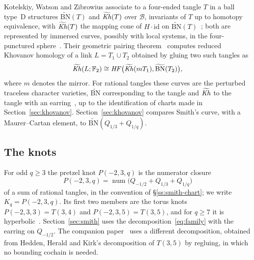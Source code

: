 Kotelskiy, Watson and Zibrowius associate to a four-ended tangle $T$ in a ball type~D structures
$\widetilde{\mathrm{BN}}(T)$ and $\widetilde{\mathit{Kh}}(T)$ over $\mathcal B$, invariants of $T$ up to homotopy
equivalence, with $\widetilde{\mathit{Kh}}(T)$ the mapping cone of $H\cdot\mathrm{id}$ on
$\widetilde{\mathrm{BN}}(T)$~\cite[Def.~6.5]{KWZ}; both are represented by immersed curves, possibly with local
systems, in the four-punctured sphere~\cite{KWZ}. Their geometric pairing
theorem~\cite[Thm.~1.9]{KWZ} computes reduced Khovanov homology of a link $L=T_1\cup T_2$ obtained by gluing two
such tangles as
\[
\widetilde{\mathit{Kh}}(L;\mathbb{F}_2)\cong\mathit{HF}\bigl(\widetilde{\mathit{Kh}}(mT_1),\widetilde{\mathrm{BN}}(T_2)\bigr),
\]
where $m$ denotes the mirror. For rational tangles these curves are the perturbed traceless character varieties,
$\widetilde{\mathrm{BN}}$ corresponding to the tangle and $\widetilde{\mathit{Kh}}$ to the tangle with an
earring~\cite[\S1.8; for $\widetilde{\mathrm{BN}}$ also \S8.2, Prop.~8.3]{KWZ}, up to the identification of charts made in Section~\ref{sec:khovanov}.
Section~\ref{sec:khovanov} compares Smith's curve, with a Maurer--Cartan element, to
$\widetilde{\mathrm{BN}}(Q_{1/3}+Q_{1/q})$.

\subsection{The knots}\label{ss:knots}
For odd $q\ge3$ the pretzel knot $P(-2,3,q)$ is the numerator closure
\begin{equation}\label{eq:family}
P(-2,3,q)=\operatorname{num}\bigl(Q_{-1/2}+Q_{1/3}+Q_{1/q}\bigr)
\end{equation}
of a sum of rational tangles, in the convention of \S\ref{ss:smith-chart}; we write $K_q=P(-2,3,q)$. Its first two
members are the torus knots $P(-2,3,3)=T(3,4)$ and $P(-2,3,5)=T(3,5)$, and for $q\ge7$ it is
hyperbolic~\cite[Prop.~4.5]{WuebbenII}. Section~\ref{sec:smith} uses the decomposition~\eqref{eq:family} with the
earring on $Q_{-1/2}$. The companion paper~\cite{WuebbenII} uses a different decomposition, obtained from Hedden,
Herald and Kirk's decomposition of $T(3,5)$ by regluing, in which no bounding cochain is needed.
